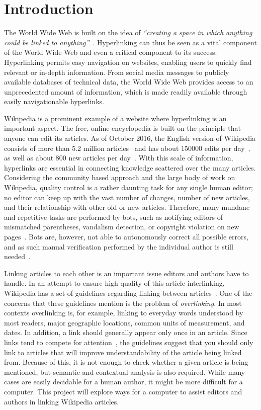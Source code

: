 \chapter{Introduction}\label{ch:introduction}
The World Wide Web is built on the idea of \emph{``creating a space in which anything could be linked to anything''}~\cite[p.~4]{Weaving-the-web}. Hyperlinking can thus be seen as a vital component of the World Wide Web and even a critical component to its success. Hyperlinking permits easy navigation on websites, enabling users to quickly find relevant or in-depth information. From social media messages to publicly available databases of technical data, the World Wide Web provides access to an unprecedented amount of information, which is made readily available through easily navigationable hyperlinks.

Wikipedia is a prominent example of a website where hyperlinking is an important aspect. The free, online encyclopedia is built on the principle that anyone can edit its articles. As of October 2016, the English version of Wikipedia consists of more than 5.2 million articles~\cite{wiki-about} and has about \num{150000} edits per day~\cite{wiki-num-edits}, as well as about 800 new articles per day~\cite{wmcharts}. With this scale of information, hyperlinks are essential in connecting knowledge scattered over the many articles. Considering the community based approach and the large body of work on Wikipedia, quality control is a rather daunting task for any single human editor; no editor can keep up with the vast number of changes, number of new articles, and their relationship with other old or new articles. Therefore, many mundane and repetitive tasks are performed by bots, such as notifying editors of mismatched parentheses, vandalism detection, or copyright violation on new pages~\cite{wiki-bots}. Bots are, however, not able to autonomously correct all possible errors, and as such manual verification performed by the individual author is still needed~\cite{wiki-bot-policy}.

Linking articles to each other is an important issue editors and authors have to handle. In an attempt to ensure high quality of this article interlinking, Wikipedia has a set of guidelines regarding linking between articles~\cite{wiki-manual-of-style-overlinking}. One of the concerns that these guidelines mention is the problem of \emph{overlinking}. In most contexts overlinking is, for example, linking to everyday words understood by most readers, major geographic locations, common units of measurement, and dates. In addition, a link should generally appear only once in an article. Since links tend to compete for attention~\cite{hyperlink-structure-using-logs}, the guidelines suggest that you should only link to articles that will improve understandability of the article being linked from. Because of this, it is not enough to check whether a given article is being mentioned, but semantic and contextual analysis is also required. While many cases are easily decidable for a human author, it might be more difficult for a computer. This project will explore ways for a computer to assist editors and authors in linking Wikipedia articles.






